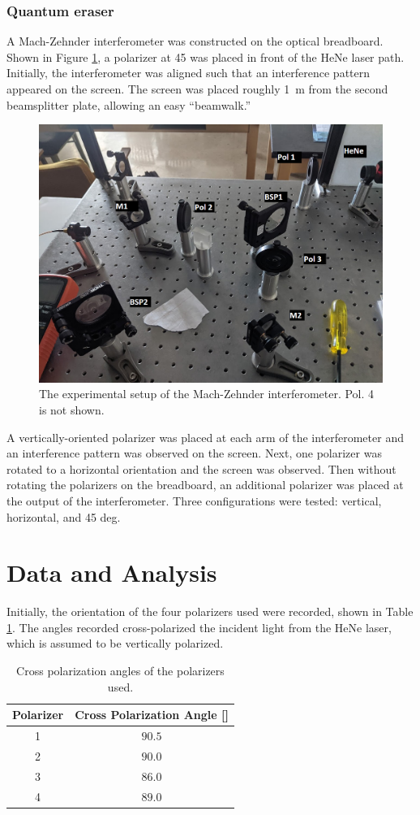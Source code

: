 \documentclass[notitlepage]{report}
\begin{document}
	\subsubsection{Quantum eraser}
	A Mach-Zehnder interferometer was constructed on the optical breadboard. Shown in Figure \ref{fig:setup}, a polarizer at \SI{45}{\deg} was placed in front of the HeNe laser path. Initially, the interferometer was aligned such that an interference pattern appeared on the screen. The screen was placed roughly \SI{1}{\m} from the second beamsplitter plate, allowing an easy ``beamwalk.'' 
	
	\begin{figure}[h]
		\centering
		\includegraphics[width=0.7\linewidth]{setup}
		\caption{The experimental setup of the Mach-Zehnder interferometer. Pol. 4 is not shown.}
		\label{fig:setup}
	\end{figure}
	
	A vertically-oriented polarizer was placed at each arm of the interferometer and an interference pattern was observed on the screen.
	Next, one polarizer was rotated to a horizontal orientation and the screen was observed. Then without rotating the polarizers on the breadboard, an additional polarizer was placed at the output of the interferometer. Three configurations were tested: vertical, horizontal, and 45 deg. 
	

	\section{Data and Analysis}
	Initially, the orientation of the four polarizers used were recorded, shown in Table \ref{table:polarization_angles}. The angles recorded cross-polarized the incident light from the HeNe laser, which is assumed to be vertically polarized. 
	
	\begin{table}[h]
		\centering
		\caption{Cross polarization angles of the polarizers used.}
		\label{table:polarization_angles}
		\begin{tabular}{cc}
			\toprule
			Polarizer & Cross Polarization Angle [\si{\deg}] \\
			\midrule
			1 & $90.5$ \\
			2 & $90.0$ \\
			3 & $86.0$ \\
			4 & $89.0$ \\
			\bottomrule
		\end{tabular}
	\end{table}
	
\end{document}
